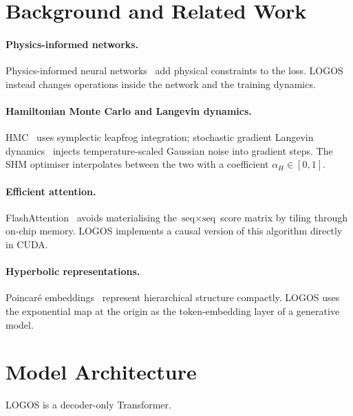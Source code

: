 \documentclass[11pt,a4paper]{article}
\newcommand{\LOGOS}{\textsc{LOGOS}}
\begin{document}
\section{Background and Related Work}
\label{sec:related}

\paragraph{Physics-informed networks.}
Physics-informed neural networks~\citep{raissi2019pinns} add physical
constraints to the loss. \LOGOS{} instead changes operations inside the
network and the training dynamics.

\paragraph{Hamiltonian Monte Carlo and Langevin dynamics.}
HMC~\citep{duane1987hybrid,neal2011mcmc} uses symplectic leapfrog
integration; stochastic gradient Langevin dynamics~\citep{welling2011bayesian}
injects temperature-scaled Gaussian noise into gradient steps. The SHM
optimiser interpolates between the two with a coefficient
$\alpha_H\in[0,1]$.

\paragraph{Efficient attention.}
FlashAttention~\citep{dao2022flashattention} avoids materialising the
$\text{seq}\times\text{seq}$ score matrix by tiling through on-chip
memory. \LOGOS{} implements a causal version of this algorithm directly
in CUDA.

\paragraph{Hyperbolic representations.}
Poincar\'e embeddings~\citep{nickel2017poincare} represent hierarchical
structure compactly. \LOGOS{} uses the exponential map at the origin as
the token-embedding layer of a generative model.

\section{Model Architecture}
\label{sec:arch}

\LOGOS{} is a decoder-only Transformer.
\end{document}
